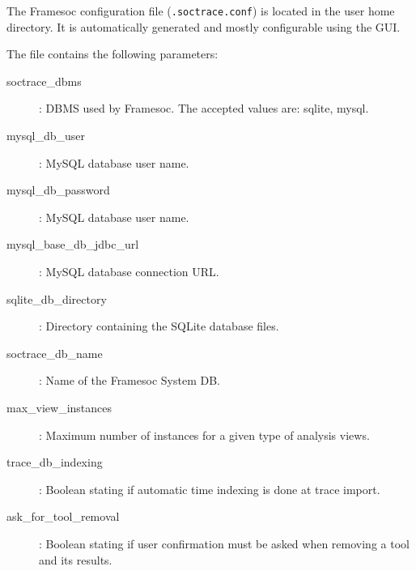 \documentclass[twoside]{article}
\begin{document}
\begin{sloppypar}
The Framesoc configuration file (\texttt{.soctrace.conf}) is located in the user home directory.
It is automatically generated and mostly configurable using the GUI.

The file contains the following parameters:
\begin{description}
 \item[soctrace\_dbms]: DBMS used by Framesoc. The accepted values are: sqlite, mysql.
 \item[mysql\_db\_user]: MySQL database user name.
 \item[mysql\_db\_password]: MySQL database user name.
 \item[mysql\_base\_db\_jdbc\_url]: MySQL database connection URL.
 \item[sqlite\_db\_directory]: Directory containing the SQLite database files.
 \item[soctrace\_db\_name]: Name of the Framesoc System DB.
 \item[max\_view\_instances]: Maximum number of instances for a given type of analysis views.
 \item[trace\_db\_indexing]: Boolean stating if automatic time indexing is done at trace import.
 \item[ask\_for\_tool\_removal]: Boolean stating if user confirmation must be asked when removing a tool and its results.
\end{description}

\newpage
\renewcommand{\refname}{References}
{}


\end{sloppypar} 
\end{document}
